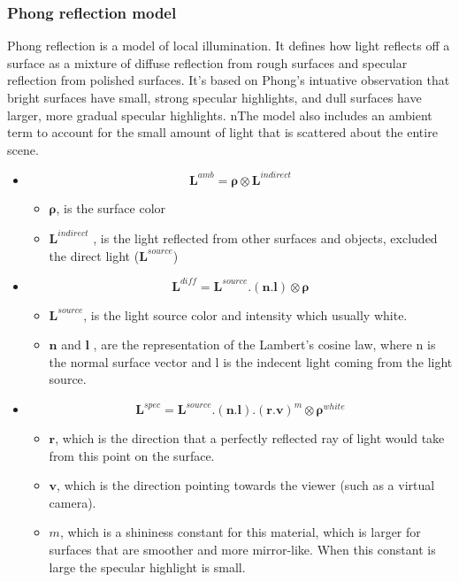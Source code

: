 \documentclass{article}
\begin{document}
	\subsubsection{Phong reflection model }
	Phong reflection is a model of local illumination. It defines how light reflects off a surface as a mixture of diffuse reflection from rough surfaces and specular reflection from polished surfaces. It's based on Phong's intuative observation that bright surfaces have small, strong specular highlights, and dull surfaces have larger, more gradual specular highlights. nThe model also includes an ambient term to account for the small amount of light that is scattered about the entire scene.
	\\
	
	\begin{itemize}
		\item {}
		\begin{equation}
			\pmb{L}^{amb} = \pmb{\rho}\otimes \pmb{L}^{indirect}
		\end{equation}
		
		\begin{itemize}
			\item $\pmb{\rho}$, is the surface color
			\item $\pmb{L}^{indirect}$ , is the light reflected from other surfaces and objects, excluded the direct light ($\pmb{L}^{source}$)
		\end{itemize}
		\item {} 
		
		\begin{equation}
			\pmb{L}^{diff} =  \pmb{L}^{source}.(\pmb{n}.\pmb{l}) \otimes \pmb{\rho} 
		\end{equation}
		\begin{itemize}
			\item $\pmb{L}^{source}$, is the light source color and intensity which usually white. 
			\item $\pmb{n}$ and $\pmb{l}$ , are the representation of the Lambert's cosine law, where n is the normal surface vector  and l is the indecent light coming from the light source.
		\end{itemize}
		\item {} 
		
		\begin{equation}
			\pmb{L}^{spec} =  \pmb{L}^{source}.(\pmb{n}.\pmb{l}).(\pmb{r}.\pmb{v})^m \otimes \pmb{\rho}^{white} 
		\end{equation}
		\begin{itemize}
			\item $\pmb{r}$, which is the direction that a perfectly reflected ray of light would take from this point on the surface. 
			\item $\pmb{v}$, which is the direction pointing towards the viewer (such as a virtual camera).
			\item $m$, which is a shininess constant for this material, which is larger for surfaces that are smoother and more mirror-like. When this constant is large the specular highlight is small.
		\end{itemize}
	\end{itemize}
	
\end{document}
